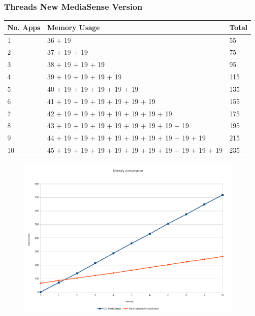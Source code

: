 \subsubsection{Threads New MediaSense Version}
\begin{center}
    \begin{tabular}{ | l | p{9cm} | l |}
    \hline
    No. Apps			 								& Memory Usage 											& Total\\ \hline
    1 													& 36 + 19			 									& 55\\ \hline
    2 													& 37 + 19 + 19					  						& 75\\ \hline
    3 													& 38 + 19 + 19 + 19						  				& 95\\ \hline
    4 													& 39 + 19 + 19 + 19 + 19							 	& 115\\ \hline
    5													& 40 + 19 + 19 + 19 + 19 + 19							& 135 \\ \hline
    6													& 41 + 19 + 19 + 19 + 19 + 19 + 19						& 155 \\ \hline
    7													& 42 + 19 + 19 + 19 + 19 + 19 + 19 + 19				& 175 \\ \hline
    8													& 43 + 19 + 19 + 19 + 19 + 19 + 19 + 19 + 19			& 195 \\ \hline
    9													& 44 + 19 + 19 + 19 + 19 + 19 + 19 + 19 + 19 + 19		& 215 \\ \hline
    10													& 45 + 19 + 19 + 19 + 19 + 19 + 19 + 19 + 19 + 19 + 19	& 235 \\ \hline
    \end{tabular}
\end{center}


\begin{figure}[H]
		\centering
    	\includegraphics[scale=0.50]{part_7/test_results/memory.pdf}
\end{figure}

